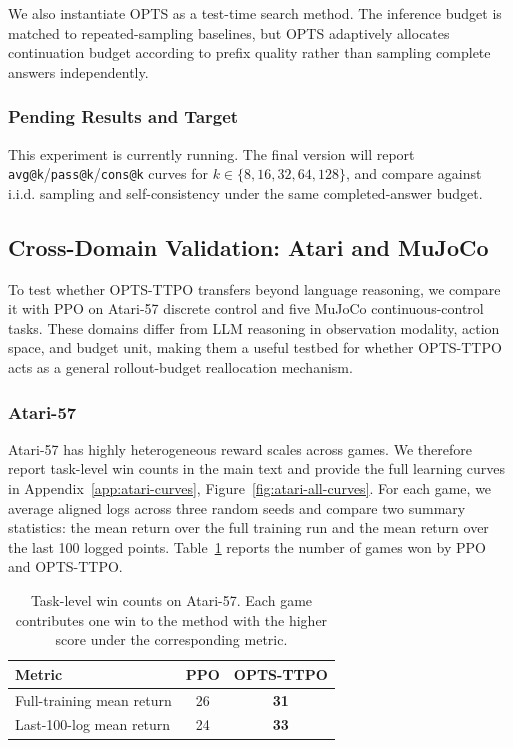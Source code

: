 We also instantiate OPTS as a test-time search method. The inference budget is matched to repeated-sampling baselines, but OPTS adaptively allocates continuation budget according to prefix quality rather than sampling complete answers independently.

\subsubsection{Pending Results and Target}

This experiment is currently running. The final version will report \texttt{avg@k}/\texttt{pass@k}/\texttt{cons@k} curves for $k\in\{8,16,32,64,128\}$, and compare against i.i.d. sampling and self-consistency under the same completed-answer budget.

\subsection{Cross-Domain Validation: Atari and MuJoCo}
\label{sec:cross-domain}

To test whether OPTS-TTPO transfers beyond language reasoning, we compare it with PPO on Atari-57 discrete control and five MuJoCo continuous-control tasks. These domains differ from LLM reasoning in observation modality, action space, and budget unit, making them a useful testbed for whether OPTS-TTPO acts as a general rollout-budget reallocation mechanism.

\subsubsection{Atari-57}
\label{sec:atari}

Atari-57 has highly heterogeneous reward scales across games. We therefore report task-level win counts in the main text and provide the full learning curves in Appendix~\ref{app:atari-curves}, Figure~\ref{fig:atari-all-curves}. For each game, we average aligned logs across three random seeds and compare two summary statistics: the mean return over the full training run and the mean return over the last 100 logged points. Table~\ref{tab:atari-win-counts} reports the number of games won by PPO and OPTS-TTPO.

\begin{table}[t]
\centering
\small
\begin{tabular}{lcc}
\hline
Metric & PPO & OPTS-TTPO \\
\hline
Full-training mean return & 26 & \textbf{31} \\
Last-100-log mean return & 24 & \textbf{33} \\
\hline
\end{tabular}
\caption{Task-level win counts on Atari-57. Each game contributes one win to the method with the higher score under the corresponding metric.}
\label{tab:atari-win-counts}
\end{table}

